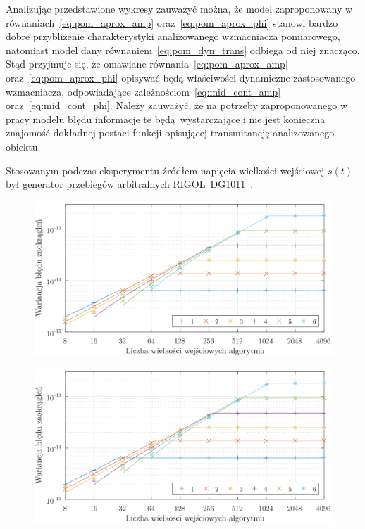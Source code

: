 Analizując przedstawione wykresy zauważyć można, że model zaproponowany w równaniach~\eqref{eq:pom_aprox_amp} oraz~\eqref{eq:pom_aprox_phi} stanowi bardzo dobre przybliżenie charakterystyki analizowanego wzmacniacza pomiarowego, natomiast model dany równaniem~\eqref{eq:pom_dyn_trans} odbiega od niej znacząco. Stąd przyjmuje się, że omawiane równania~\eqref{eq:pom_aprox_amp} oraz~\eqref{eq:pom_aprox_phi} opisywać będą właściwości dynamiczne zastosowanego wzmacniacza, odpowiadające zależnościom~\eqref{eq:mid_cont_amp} oraz~\eqref{eq:mid_cont_phi}. Należy zauważyć, że na potrzeby zaproponowanego w pracy modelu błędu informacje te będą wystarczające i nie jest konieczna znajomość dokładnej postaci funkcji opisującej transmitancję analizowanego obiektu.

Stosowanym podczas eksperymentu źródłem napięcia wielkości wejściowej $s(t)$ był generator przebiegów arbitralnych RIGOL~DG1011~\cite{rigol_manual}.

\begin{figure}[htb!]
\begin{center}
\includegraphics{obrazki/dwt_rerror_coif5}
\end{center}
\end{figure}

\begin{figure}[htb!]
\begin{center}
\includegraphics{obrazki/dwt_rerror_coif5}
\end{center}
\end{figure}


